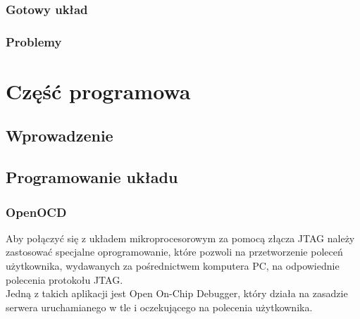 \documentclass[a4paper,12pt]{book}
\begin{document}
			\subsection{Gotowy układ}
			\subsection{Problemy}






	\chapter{Część programowa}
		\section{Wprowadzenie}
		\section{Programowanie układu}
		
			\subsection{OpenOCD}
				Aby połączyć się z układem mikroprocesorowym za pomocą złącza JTAG należy zastosować specjalne oprogramowanie, które pozwoli na przetworzenie poleceń użytkownika, wydawanych za pośrednictwem komputera PC, na odpowiednie polecenia protokołu JTAG.\\
				Jedną z takich aplikacji jest Open On-Chip Debugger\cite{openocd}, który działa na zasadzie serwera uruchamianego w tle i oczekującego na polecenia użytkownika.
\end{document}
